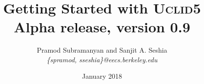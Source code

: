 \documentclass[oneside]{scrbook}
\newcommand{\uclid}{{\textsc{Uclid5}}\xspace}
\begin{document}
\title{Getting Started with {\uclid}\\Alpha release, version 0.9}
\author{Pramod Subramanyan and Sanjit A. Seshia \\
        \textit{\{spramod, sseshia\}@eecs.berkeley.edu}}
\date{January 2018}
\maketitle

\tableofcontents
\listofuclidlisting









\appendix

\end{document}
